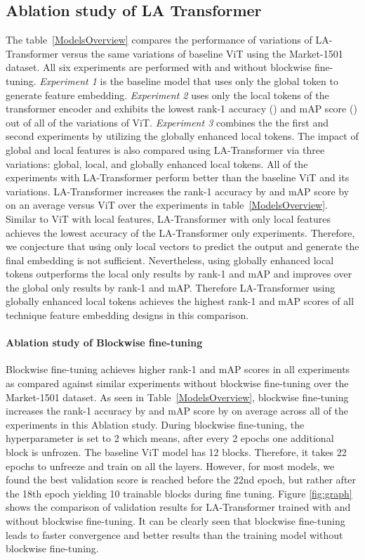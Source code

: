 \documentclass{article}
\begin{document}
\subsection{Ablation study of LA Transformer}
The table~\ref{ModelsOverview} compares the performance of variations of LA-Transformer versus the same variations of baseline ViT using the Market-1501 dataset. All six experiments are performed with and without blockwise fine-tuning. \textit{Experiment 1} is the baseline model that uses only the global token to generate feature embedding. \textit{Experiment 2} uses only the local tokens of the transformer encoder and exhibits the lowest rank-1 accuracy () and mAP score () out of all of the variations of ViT.  \textit{Experiment 3} combines the the first and second experiments by utilizing the globally enhanced local tokens. The impact of global and local features is also compared using LA-Transformer via three variations:  global, local, and globally enhanced local tokens.  All of the experiments with LA-Transformer perform better than the baseline ViT and its variations. LA-Transformer increases the rank-1 accuracy by   and mAP score by  on an average versus ViT over the experiments in table~\ref{ModelsOverview}. Similar to ViT with local features, LA-Transformer with only local features achieves the lowest accuracy of the LA-Transformer only experiments.  Therefore, we conjecture that using only local vectors to predict the output and generate the final embedding is not sufficient. Nevertheless, using globally enhanced local tokens outperforms the local only results by  rank-1 and  mAP and improves over the global only results by  rank-1 and  mAP. Therefore LA-Transformer using globally enhanced local tokens achieves the highest rank-1 and mAP scores of all technique  feature embedding designs in this comparison.

\paragraph{Ablation study of Blockwise fine-tuning}
Blockwise fine-tuning achieves higher rank-1 and mAP scores in all experiments as compared against similar experiments without blockwise fine-tuning over the Market-1501 dataset. As seen in Table~\ref{ModelsOverview}, blockwise fine-tuning increases the rank-1 accuracy by  and mAP score by   on average across all of the experiments in this Ablation study. During blockwise fine-tuning, the hyperparameter  is set to 2 which means, after every 2 epochs one additional block is unfrozen. The baseline ViT model has 12 blocks. Therefore, it takes 22 epochs to unfreeze and train on all the layers. However, for most models, we found the best validation score is reached before the 22nd epoch, but rather after the 18th epoch yielding 10 trainable blocks during fine tuning. Figure \ref{fig:graph} shows the comparison of validation results for LA-Transformer trained with and without blockwise fine-tuning. It can be clearly seen that blockwise fine-tuning leads to faster convergence and better results than the training model without blockwise fine-tuning.
\end{document}
